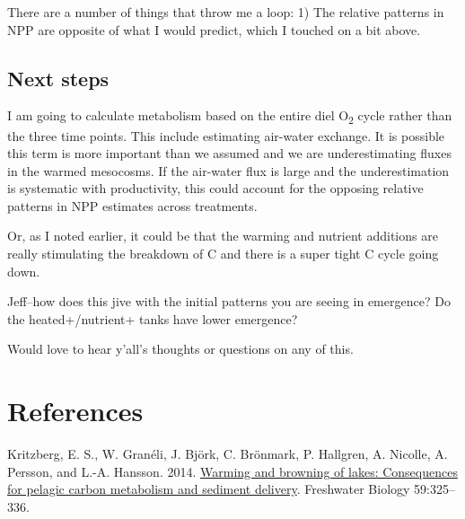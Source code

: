 \documentclass[
]{article}
\newlength{\cslhangindent}
\newlength{\cslentryspacingunit} %
\newenvironment{CSLReferences}[2] %
 {%
  \setlength{\parindent}{0pt}
  \ifodd #1
  \let\oldpar\par
  \def\par{\hangindent=\cslhangindent\oldpar}
  \fi
  \setlength{\parskip}{#2\cslentryspacingunit}
 }%
 {}
\begin{document}
There are a number of things that throw me a loop: 1) The relative
patterns in NPP are opposite of what I would predict, which I touched on
a bit above.

\hypertarget{next-steps}{%
\subsection{Next steps}\label{next-steps}}

I am going to calculate metabolism based on the entire diel
O\textsubscript{2} cycle rather than the three time points. This include
estimating air-water exchange. It is possible this term is more
important than we assumed and we are underestimating fluxes in the
warmed mesocosms. If the air-water flux is large and the underestimation
is systematic with productivity, this could account for the opposing
relative patterns in NPP estimates across treatments.

Or, as I noted earlier, it could be that the warming and nutrient
additions are really stimulating the breakdown of C and there is a super
tight C cycle going down.

Jeff--how does this jive with the initial patterns you are seeing in
emergence? Do the heated+/nutrient+ tanks have lower emergence?

Would love to hear y'all's thoughts or questions on any of this.

\hypertarget{references}{%
\section*{References}\label{references}}

\hypertarget{refs}{}
\begin{CSLReferences}{1}{0}
\leavevmode{}%
Kritzberg, E. S., W. Granéli, J. Björk, C. Brönmark, P. Hallgren, A.
Nicolle, A. Persson, and L.-A. Hansson. 2014.
\href{https://doi.org/10.1111/fwb.12267}{Warming and browning of lakes:
Consequences for pelagic carbon metabolism and sediment delivery}.
Freshwater Biology 59:325--336.

\end{CSLReferences}
\end{document}
